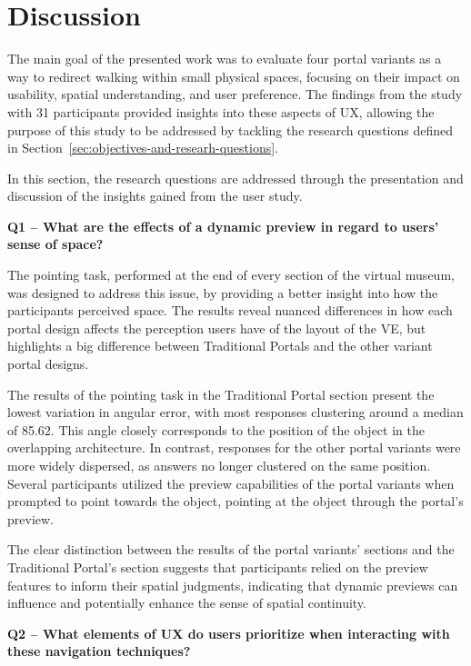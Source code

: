 \section{Discussion}
\label{sec:discussion}

The main goal of the presented work was to evaluate four portal variants as a way to redirect walking within small physical spaces, 
focusing on their impact on usability, spatial understanding, and user preference. The findings from the study with 31 participants 
provided insights into these aspects of \gls{UX}, allowing the purpose of this study to be addressed by tackling the research questions 
defined in Section~\ref{sec:objectives-and-researh-questions}.

In this section, the research questions are addressed through the presentation and discussion of the insights gained from the user study.

\noindent
\textbf{Q1 -- What are the effects of a dynamic preview in regard to users' sense of space?}

The pointing task, performed at the end of every section of the virtual museum, was designed to address this issue, by providing a better 
insight into how the participants perceived space. The results reveal nuanced differences in how each portal design affects the perception 
users have of the layout of the \gls{VE}, but highlights a big difference between Traditional Portals and the other variant portal designs.

The results of the pointing task in the Traditional Portal section present the lowest variation in angular error, with most responses 
clustering around a median of 85.62\textdegree. This angle closely corresponds to the position of the object in the overlapping 
architecture. In contrast, responses for the other portal variants were more widely dispersed, as answers no longer clustered on the same 
position. Several participants utilized the preview capabilities of the portal variants when prompted to point towards the object, pointing 
at the object through the portal's preview. 

The clear distinction between the results of the portal variants' sections and the Traditional Portal's section suggests that participants 
relied on the preview features to inform their spatial judgments, indicating that dynamic previews can influence and potentially enhance 
the sense of spatial continuity.


\noindent
\textbf{Q2 -- What elements of \gls{UX} do users prioritize when interacting with these navigation techniques?}

